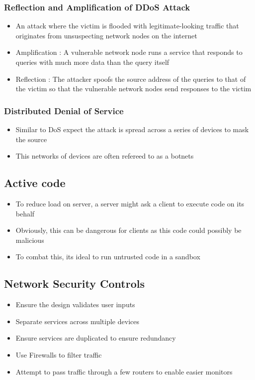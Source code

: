 \documentclass[twoside]{article}
\begin{document}
\subsubsection{Reflection and Amplification of DDoS Attack}
\begin{itemize}
\item An attack where the victim is flooded with legitimate-looking traffic that originates from unsuspecting network nodes on the internet
\item Amplification : A vulnerable network node runs a service that responds to queries with much more data than the query itself
\item Reflection : The attacker spoofs the source address of the queries to that of the victim so that the vulnerable network nodes send responses to the victim
\end{itemize}

\subsubsection{Distributed Denial of Service}
\begin{itemize}
\item Similar to DoS expect the attack is spread across a series of devices to mask the source
\item This networks of devices are often refereed to as a botnets
\end{itemize}

\subsection{Active code}
\begin{itemize}
\item To reduce load on server, a server might ask a client to execute code on its behalf
\item Obviously, this can be dangerous for clients as this code could possibly be malicious
\item To combat this, its ideal to run untrusted code in a sandbox
\end{itemize}


\subsection{Network Security Controls}
\begin{itemize}
\item Ensure the design validates user inputs
\item Separate services across multiple devices
\item Ensure services are duplicated to ensure redundancy
\item Use Firewalls to filter traffic
\item Attempt to pass traffic through a few routers to enable easier monitors
\end{itemize}
\end{document}
